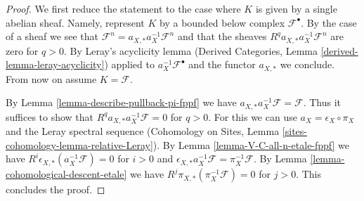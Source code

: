 \documentclass[10pt,a4paper]{amsart}
\theoremstyle{plain}
\theoremstyle{definition}
\theoremstyle{remark}
\numberwithin{equation}{subsection}
\begin{document}
\begin{proof}
We first reduce the statement to the case where
$K$ is given by a single abelian sheaf. Namely, represent $K$
by a bounded below complex $\mathcal{F}^\bullet$. By the case of a
sheaf we see that
$\mathcal{F}^n = a_{X, *} a_X^{-1} \mathcal{F}^n$
and that the sheaves $R^qa_{X, *}a_X^{-1}\mathcal{F}^n$
are zero for $q > 0$. By Leray's acyclicity lemma
(Derived Categories, Lemma \ref{derived-lemma-leray-acyclicity})
applied to $a_X^{-1}\mathcal{F}^\bullet$
and the functor $a_{X, *}$ we conclude. From now on assume $K = \mathcal{F}$.

\medskip\noindent
By Lemma \ref{lemma-describe-pullback-pi-fppf} we have
$a_{X, *}a_X^{-1}\mathcal{F} = \mathcal{F}$. Thus it suffices to show that
$R^qa_{X, *}a_X^{-1}\mathcal{F} = 0$ for $q > 0$.
For this we can use $a_X = \epsilon_X \circ \pi_X$ and
the Leray spectral sequence
(Cohomology on Sites, Lemma \ref{sites-cohomology-lemma-relative-Leray}).
By Lemma \ref{lemma-V-C-all-n-etale-fppf}
we have $R^i\epsilon_{X, *}(a_X^{-1}\mathcal{F}) = 0$ for $i > 0$
and
$\epsilon_{X, *}a_X^{-1}\mathcal{F} = \pi_X^{-1}\mathcal{F}$.
By Lemma \ref{lemma-cohomological-descent-etale} we have
$R^j\pi_{X, *}(\pi_X^{-1}\mathcal{F}) = 0$ for $j > 0$.
This concludes the proof.
\end{proof}
\end{document}
